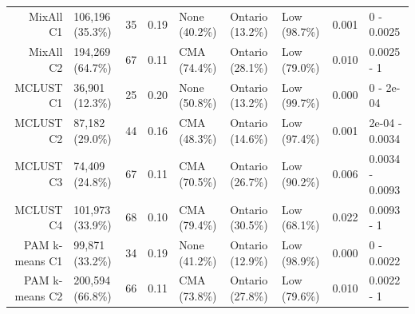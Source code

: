 \documentclass[11pt, a4paper]{article}
\begin{document}
\begin{table}[H]
{\begin{tabular}{|r|llllllll|}
  MixAll C1 & 106,196 (35.3\%) & 35 & 0.19 & None (40.2\%) & Ontario (13.2\%) & Low (98.7\%) & 0.001 & 0 - 0.0025 \\
  MixAll C2 & 194,269 (64.7\%) & 67 & 0.11 & CMA (74.4\%) & Ontario (28.1\%) & Low (79.0\%) & 0.010 & 0.0025 - 1 \\
\rowcolor{gray!25}  MCLUST C1 & 36,901 (12.3\%) & 25 & 0.20 & None (50.8\%) & Ontario (13.2\%) & Low (99.7\%) & 0.000 & 0 - 2e-04 \\
\rowcolor{gray!25}  MCLUST C2 & 87,182 (29.0\%) & 44 & 0.16 & CMA (48.3\%) & Ontario (14.6\%) & Low (97.4\%) & 0.001 & 2e-04 - 0.0034 \\
 \rowcolor{gray!25} MCLUST C3 & 74,409 (24.8\%) & 67 & 0.11 & CMA (70.5\%) & Ontario (26.7\%) & Low (90.2\%) & 0.006 & 0.0034 - 0.0093 \\
 \rowcolor{gray!25} MCLUST C4 & 101,973 (33.9\%) & 68 & 0.10 & CMA (79.4\%) & Ontario (30.5\%) & Low (68.1\%) & 0.022 & 0.0093 - 1 \\
  PAM k-means C1 & 99,871 (33.2\%) & 34 & 0.19 & None (41.2\%) & Ontario (12.9\%) & Low (98.9\%) & 0.000 & 0 - 0.0022 \\
  PAM k-means C2 & 200,594 (66.8\%) & 66 & 0.11 & CMA (73.8\%) & Ontario (27.8\%) & Low (79.6\%) & 0.010 & 0.0022 - 1 \\
   \hline
\end{tabular}
}
\end{table}
\end{document}
